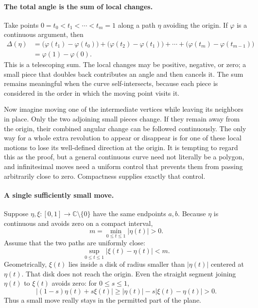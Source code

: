 \paragraph{The total angle is the sum of local changes.}
Take points \(0=t_0<t_1<\cdots<t_m=1\) along a path \(\eta\) avoiding the origin. If \(\varphi\) is a continuous argument, then
\begin{align*}
 \Delta(\eta)
 &=\bigl(\varphi(t_1)-\varphi(t_0)\bigr)
  +\bigl(\varphi(t_2)-\varphi(t_1)\bigr)
  +\cdots
  +\bigl(\varphi(t_m)-\varphi(t_{m-1})\bigr)\\
 &=\varphi(1)-\varphi(0).
\end{align*}
This is a telescoping sum. The local changes may be positive, negative, or zero; a small piece that doubles back contributes an angle and then cancels it. The sum remains meaningful when the curve self-intersects, because each piece is considered in the order in which the moving point visits it.

Now imagine moving one of the intermediate vertices while leaving its neighbors in place. Only the two adjoining small pieces change. If they remain away from the origin, their combined angular change can be followed continuously. The only way for a whole extra revolution to appear or disappear is for one of these local motions to lose its well-defined direction at the origin. It is tempting to regard this as the proof, but a general continuous curve need not literally be a polygon, and infinitesimal moves need a uniform control that prevents them from passing arbitrarily close to zero. Compactness supplies exactly that control.

\paragraph{A single sufficiently small move.}
Suppose \(\eta,\xi:[0,1]\to\mathbb C\setminus\{0\}\) have the same endpoints \(a,b\). Because \(\eta\) is continuous and avoids zero on a compact interval,
\[
 m=\min_{0\leq t\leq1}|\eta(t)|>0.
\]
Assume that the two paths are uniformly close:
\begin{equation}
 \sup_{0\leq t\leq1}|\xi(t)-\eta(t)|<m.
 \label{eq:N20261110-close-move}
\end{equation}
Geometrically, \(\xi(t)\) lies inside a disk of radius smaller than \(|\eta(t)|\) centered at \(\eta(t)\). That disk does not reach the origin. Even the straight segment joining \(\eta(t)\) to \(\xi(t)\) avoids zero: for \(0\leq s\leq1\),
\[
 |(1-s)\eta(t)+s\xi(t)|
 \geq|\eta(t)|-s|\xi(t)-\eta(t)|>0.
\]
Thus a small move really stays in the permitted part of the plane.

